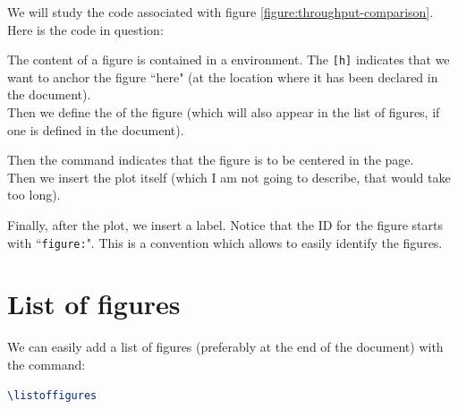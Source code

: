 We will study the code associated with figure \ref{figure:throughput-comparison}. \\


Here is the code in question:




The content of a figure is contained in a  environment. The \texttt{[h]} indicates that we want to anchor the figure ``here" (at the location where it has been declared in the document). \\

Then we define the  of the figure (which will also appear in the list of figures, if one is defined in the document).

Then the command  indicates that the figure is to be centered in the page. \\

Then we insert the plot itself (which I am not going to describe, that would take too long).

Finally, after the plot, we insert a label. Notice that the ID for the figure starts with ``\texttt{figure:}". This is a convention which allows to easily identify the figures.


\section{List of figures}

We can easily add a list of figures (preferably at the end of the document) with the  command:
\begin{lstlisting}[language=tex]
\listoffigures
\end{lstlisting}

